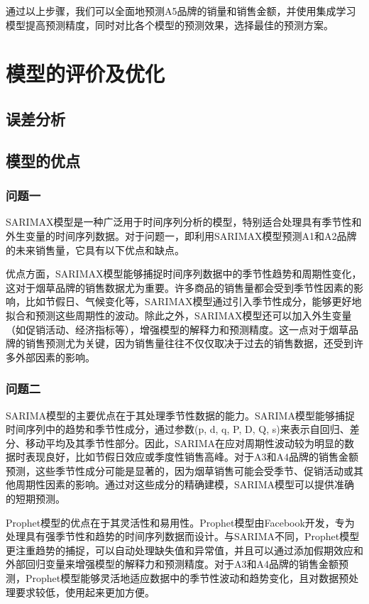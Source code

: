 \documentclass[a4paper]{article}
\begin{document}
	通过以上步骤，我们可以全面地预测A5品牌的销量和销售金额，并使用集成学习模型提高预测精度，同时对比各个模型的预测效果，选择最佳的预测方案。
	\section{模型的评价及优化}
	\subsection{误差分析}
	\subsection{模型的优点}
	\subsubsection{问题一}
	SARIMAX模型是一种广泛用于时间序列分析的模型，特别适合处理具有季节性和外生变量的时间序列数据。对于问题一，即利用SARIMAX模型预测A1和A2品牌的未来销售量，它具有以下优点和缺点。

	优点方面，SARIMAX模型能够捕捉时间序列数据中的季节性趋势和周期性变化，这对于烟草品牌的销售数据尤为重要。许多商品的销售量都会受到季节性因素的影响，比如节假日、气候变化等，SARIMAX模型通过引入季节性成分，能够更好地拟合和预测这些周期性的波动。除此之外，SARIMAX模型还可以加入外生变量（如促销活动、经济指标等），增强模型的解释力和预测精度。这一点对于烟草品牌的销售预测尤为关键，因为销售量往往不仅仅取决于过去的销售数据，还受到许多外部因素的影响。

	\subsubsection{问题二}
	SARIMA模型的主要优点在于其处理季节性数据的能力。SARIMA模型能够捕捉时间序列中的趋势和季节性成分，通过参数(p, d, q, P, D, Q, s)来表示自回归、差分、移动平均及其季节性部分。因此，SARIMA在应对周期性波动较为明显的数据时表现良好，比如节假日效应或季度性销售高峰。对于A3和A4品牌的销售金额预测，这些季节性成分可能是显著的，因为烟草销售可能会受季节、促销活动或其他周期性因素的影响。通过对这些成分的精确建模，SARIMA模型可以提供准确的短期预测。
	
	Prophet模型的优点在于其灵活性和易用性。Prophet模型由Facebook开发，专为处理具有强季节性和趋势的时间序列数据而设计。与SARIMA不同，Prophet模型更注重趋势的捕捉，可以自动处理缺失值和异常值，并且可以通过添加假期效应和外部回归变量来增强模型的解释力和预测精度。对于A3和A4品牌的销售金额预测，Prophet模型能够灵活地适应数据中的季节性波动和趋势变化，且对数据预处理要求较低，使用起来更加方便。
	
\end{document}
